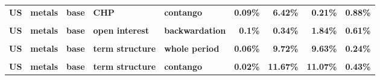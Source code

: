 \documentclass[
  authoryear,
  preprint,
  3p]{elsarticle}
\begin{document}
\begin{landscape}
\begin{longtable}[t]{>{}l>{}l>{}l>{}l>{}l>{}r>{}r>{}r>{}r}
\addlinespace
\textbf{US} & \textbf{metals} & \textbf{base} & \textbf{CHP} & \textbf{contango} & \textcolor[HTML]{4285f4}{\textbf{0.09\%}} & \textcolor[HTML]{4285f4}{\textbf{6.42\%}} & \textcolor[HTML]{4285f4}{\textbf{0.21\%}} & \textcolor[HTML]{4285f4}{\textbf{0.88\%}}\\
\textbf{\cellcolor{gray!10}{US}} & \textbf{\cellcolor{gray!10}{metals}} & \textbf{\cellcolor{gray!10}{base}} & \textbf{\cellcolor{gray!10}{open interest}} & \textbf{\cellcolor{gray!10}{whole period}} & \textcolor[HTML]{4285f4}{\textbf{\cellcolor{gray!10}{0.18\%}}} & \textcolor[HTML]{4285f4}{\textbf{\cellcolor{gray!10}{1.01\%}}} & \textcolor[HTML]{4285f4}{\textbf{\cellcolor{gray!10}{2.78\%}}} & \textcolor[HTML]{4285f4}{\textbf{\cellcolor{gray!10}{0.46\%}}}\\
\textbf{US} & \textbf{metals} & \textbf{base} & \textbf{open interest} & \textbf{backwardation} & \textcolor[HTML]{4285f4}{\textbf{0.1\%}} & \textcolor[HTML]{4285f4}{\textbf{0.34\%}} & \textcolor[HTML]{4285f4}{\textbf{1.84\%}} & \textcolor[HTML]{4285f4}{\textbf{0.61\%}}\\
\textbf{\cellcolor{gray!10}{US}} & \textbf{\cellcolor{gray!10}{metals}} & \textbf{\cellcolor{gray!10}{base}} & \textbf{\cellcolor{gray!10}{open interest}} & \textbf{\cellcolor{gray!10}{contango}} & \textcolor[HTML]{4285f4}{\textbf{\cellcolor{gray!10}{0.24\%}}} & \textcolor[HTML]{4285f4}{\textbf{\cellcolor{gray!10}{1.82\%}}} & \textcolor[HTML]{4285f4}{\textbf{\cellcolor{gray!10}{3.42\%}}} & \textcolor[HTML]{4285f4}{\textbf{\cellcolor{gray!10}{0.37\%}}}\\
\textbf{US} & \textbf{metals} & \textbf{base} & \textbf{term structure} & \textbf{whole period} & \textcolor[HTML]{4285f4}{\textbf{0.06\%}} & \textcolor[HTML]{4285f4}{\textbf{9.72\%}} & \textcolor[HTML]{4285f4}{\textbf{9.63\%}} & \textcolor[HTML]{4285f4}{\textbf{0.24\%}}\\
\addlinespace
\textbf{\cellcolor{gray!10}{US}} & \textbf{\cellcolor{gray!10}{metals}} & \textbf{\cellcolor{gray!10}{base}} & \textbf{\cellcolor{gray!10}{term structure}} & \textbf{\cellcolor{gray!10}{backwardation}} & \textcolor[HTML]{4285f4}{\textbf{\cellcolor{gray!10}{0.37\%}}} & \textcolor[HTML]{4285f4}{\textbf{\cellcolor{gray!10}{7.74\%}}} & \textcolor[HTML]{4285f4}{\textbf{\cellcolor{gray!10}{7.44\%}}} & \textcolor[HTML]{4285f4}{\textbf{\cellcolor{gray!10}{0.12\%}}}\\
\textbf{US} & \textbf{metals} & \textbf{base} & \textbf{term structure} & \textbf{contango} & \textcolor[HTML]{4285f4}{\textbf{0.02\%}} & \textcolor[HTML]{4285f4}{\textbf{11.67\%}} & \textcolor[HTML]{4285f4}{\textbf{11.07\%}} & \textcolor[HTML]{4285f4}{\textbf{0.43\%}}\\

\end{longtable}
\end{landscape}
\end{document}
